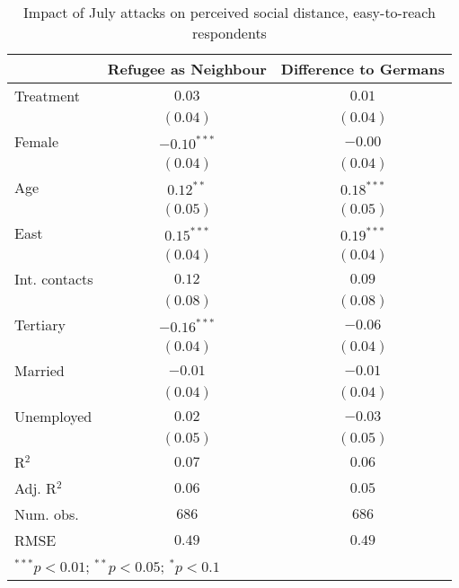 
\begin{table}
\caption{Impact of July attacks on perceived social distance, easy-to-reach respondents}
\begin{center}
\begin{tabular}{l c c}
\toprule
 & Refugee as Neighbour & Difference to Germans \\
\midrule
Treatment     & $0.03$        & $0.01$       \\
              & $(0.04)$      & $(0.04)$     \\
Female        & $-0.10^{***}$ & $-0.00$      \\
              & $(0.04)$      & $(0.04)$     \\
Age           & $0.12^{**}$   & $0.18^{***}$ \\
              & $(0.05)$      & $(0.05)$     \\
East          & $0.15^{***}$  & $0.19^{***}$ \\
              & $(0.04)$      & $(0.04)$     \\
Int. contacts & $0.12$        & $0.09$       \\
              & $(0.08)$      & $(0.08)$     \\
Tertiary      & $-0.16^{***}$ & $-0.06$      \\
              & $(0.04)$      & $(0.04)$     \\
Married       & $-0.01$       & $-0.01$      \\
              & $(0.04)$      & $(0.04)$     \\
Unemployed    & $0.02$        & $-0.03$      \\
              & $(0.05)$      & $(0.05)$     \\
\midrule
R$^2$         & $0.07$        & $0.06$       \\
Adj. R$^2$    & $0.06$        & $0.05$       \\
Num. obs.     & $686$         & $686$        \\
RMSE          & $0.49$        & $0.49$       \\
\bottomrule
\multicolumn{3}{l}{\scriptsize{$^{***}p<0.01$; $^{**}p<0.05$; $^{*}p<0.1$}}
\end{tabular}
\label{tab_dist_reach}
\end{center}
\end{table}
